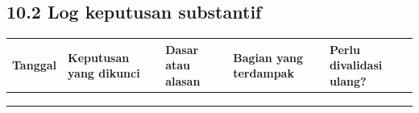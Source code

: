 \documentclass[
  indonesian,
  11pt,
]{article}
\newcounter{none} %
\begin{document}
\subsection{10.2 Log keputusan
substantif}\label{log-keputusan-substantif}

{\def\LTcaptype{none} %
\begin{longtable}[]{@{}
  >{\raggedright\arraybackslash}p{}
  >{\raggedright\arraybackslash}p{}
  >{\raggedright\arraybackslash}p{}
  >{\raggedright\arraybackslash}p{}
  >{\raggedright\arraybackslash}p{}@{}}
\toprule\noalign{}
\begin{minipage}[b]{\linewidth}\raggedright
Tanggal
\end{minipage} & \begin{minipage}[b]{\linewidth}\raggedright
Keputusan yang dikunci
\end{minipage} & \begin{minipage}[b]{\linewidth}\raggedright
Dasar atau alasan
\end{minipage} & \begin{minipage}[b]{\linewidth}\raggedright
Bagian yang terdampak
\end{minipage} & \begin{minipage}[b]{\linewidth}\raggedright
Perlu divalidasi ulang?
\end{minipage} \\
\midrule\noalign{}
\endhead
\bottomrule\noalign{}
\endlastfoot
& & & & \\
& & & & \\
& & & & \\
\end{longtable}
}
\end{document}
